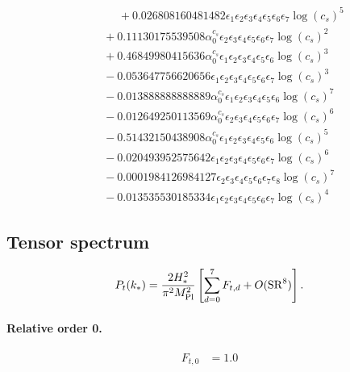 \documentclass[10pt]{article}
\begin{document}
\begin{align*}
\phantom{F_{s,7}} &\phantom{={}}{}  + 0.026808160481482 \epsilon_{1} \epsilon_{2} \epsilon_{3} \epsilon_{4} \epsilon_{5} \epsilon_{6} \epsilon_{7} \log{\left(c_{s} \right)}^{5} \\
&{}  + 0.11130175539508 \alpha_{0}^{c_s} \epsilon_{2} \epsilon_{3} \epsilon_{4} \epsilon_{5} \epsilon_{6} \epsilon_{7} \log{\left(c_{s} \right)}^{2} \\
&{}  + 0.46849980415636 \alpha_{0}^{c_s} \epsilon_{1} \epsilon_{2} \epsilon_{3} \epsilon_{4} \epsilon_{5} \epsilon_{6} \log{\left(c_{s} \right)}^{3} \\
&{}  - 0.053647756620656 \epsilon_{1} \epsilon_{2} \epsilon_{3} \epsilon_{4} \epsilon_{5} \epsilon_{6} \epsilon_{7} \log{\left(c_{s} \right)}^{3} \\
&{}  - 0.013888888888889 \alpha_{0}^{c_s} \epsilon_{1} \epsilon_{2} \epsilon_{3} \epsilon_{4} \epsilon_{5} \epsilon_{6} \log{\left(c_{s} \right)}^{7} \\
&{}  - 0.012649250113569 \alpha_{0}^{c_s} \epsilon_{2} \epsilon_{3} \epsilon_{4} \epsilon_{5} \epsilon_{6} \epsilon_{7} \log{\left(c_{s} \right)}^{6} \\
&{}  - 0.51432150438908 \alpha_{0}^{c_s} \epsilon_{1} \epsilon_{2} \epsilon_{3} \epsilon_{4} \epsilon_{5} \epsilon_{6} \log{\left(c_{s} \right)}^{5} \\
&{}  - 0.020493952575642 \epsilon_{1} \epsilon_{2} \epsilon_{3} \epsilon_{4} \epsilon_{5} \epsilon_{6} \epsilon_{7} \log{\left(c_{s} \right)}^{6} \\
&{}  - 0.0001984126984127 \epsilon_{2} \epsilon_{3} \epsilon_{4} \epsilon_{5} \epsilon_{6} \epsilon_{7} \epsilon_{8} \log{\left(c_{s} \right)}^{7} \\
&{}  - 0.013535530185334 \epsilon_{1} \epsilon_{2} \epsilon_{3} \epsilon_{4} \epsilon_{5} \epsilon_{6} \epsilon_{7} \log{\left(c_{s} \right)}^{4}
\end{align*}

\subsection{Tensor spectrum}
\[P_t(k_*)=\frac{2H_*^2}{\pi^2M_{\rm Pl}^2}\left[\sum_{d=0}^{7}F_{t,d}+O(\mathrm{SR}^{8})\right].\]
\paragraph{Relative order 0.}
\begin{align*}
F_{t,0} &= 1.0
\end{align*}
\end{document}
